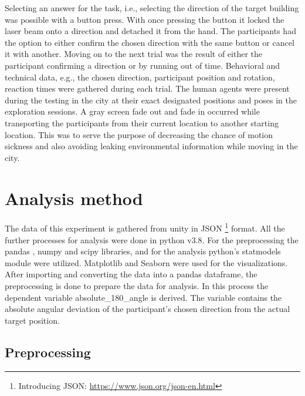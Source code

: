 Selecting an answer for the task, i.e., selecting the direction of the target building was possible with a button press. With once pressing the button it locked the laser beam onto a direction and detached it from the hand. The participants had the option to either confirm the chosen direction with the same button or cancel it with another. Moving on to the next trial was the result of either the participant confirming a direction or by running out of time. Behavioral and technical data, e.g., the chosen direction, participant position and rotation, reaction times were gathered during each trial. The human agents were present during the testing in the city at their exact designated positions and poses in the exploration sessions. A gray screen fade out and fade in occurred while transporting the participants from their current location to another starting location. This was to serve the purpose of decreasing the chance of motion sickness and also avoiding leaking environmental information while moving in the city.


\section{Analysis method}

The data of this experiment is gathered from unity in JSON \footnote{Introducing JSON: \href{https://www.json.org/json-en.html}{https://www.json.org/json-en.html}} format. All the further processes for analysis were done in python \autocite{10.5555/1593511} v3.8. For the preprocessing the pandas \autocite{reback2022pandas, mckinney-proc-scipy-2010}, numpy \autocite{harris2020array} and scipy \autocite{2020SciPy-NMeth} libraries, and for the analysis python's statmodels \autocite{seabold2010statsmodels} module were utilized. Matplotlib \autocite{Hunter:2007} and Seaborn \autocite{Waskom2021} were used for the visualizations.\\

After importing and converting the data into a pandas dataframe, the preprocessing is done to prepare the data for analysis. In this process the dependent variable {\emphasize absolute\_180\_angle} is derived. The variable contains the absolute angular deviation of the participant's chosen direction from the actual target position. 

\subsection{Preprocessing}

